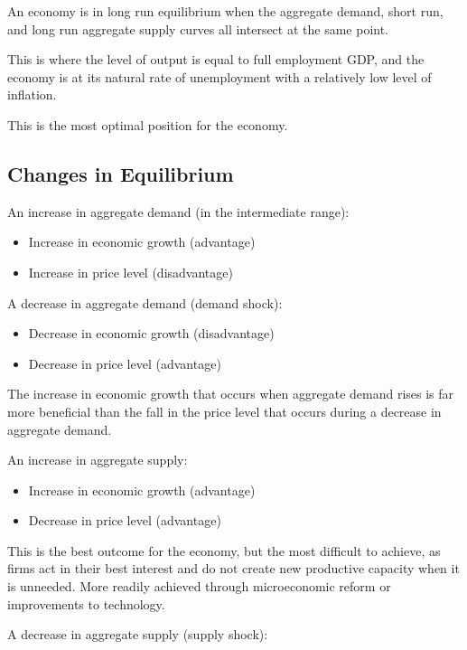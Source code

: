 \documentclass[a4paper,11pt]{article}
\begin{document}

An economy is in long run equilibrium when the aggregate demand, short
run, and long run aggregate supply curves all intersect at the same point.

This is where the level of output is equal to full employment GDP, and the
economy is at its natural rate of unemployment with a relatively low level of
inflation.

This is the most optimal position for the economy.


\subsection{Changes in Equilibrium}

An increase in aggregate demand (in the intermediate range):

\begin{itemize}
\item Increase in economic growth (advantage)
\item Increase in price level (disadvantage)
\end{itemize}

A decrease in aggregate demand (demand shock):

\begin{itemize}
\item Decrease in economic growth (disadvantage)
\item Decrease in price level (advantage)
\end{itemize}

The increase in economic growth that occurs when aggregate demand rises is far
more beneficial than the fall in the price level that occurs during a decrease
in aggregate demand.

An increase in aggregate supply:

\begin{itemize}
\item Increase in economic growth (advantage)
\item Decrease in price level (advantage)
\end{itemize}

This is the best outcome for the economy, but the most difficult to achieve, as
firms act in their best interest and do not create new productive capacity when
it is unneeded. More readily achieved through microeconomic reform or
improvements to technology.

A decrease in aggregate supply (supply shock):
\end{document}

